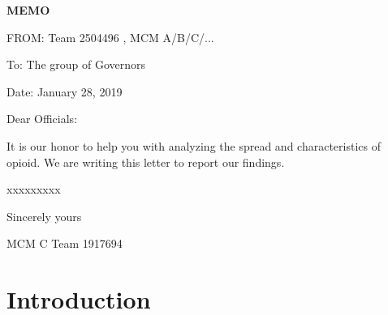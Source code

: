 \documentclass[13pt]{article}
\begin{document}

\setmainfont{TeX Gyre Pagella}
\newpage
{}
\thispagestyle{empty}

{\centering \fontsize{18pt}{14pt}\selectfont \textbf{MEMO}\par}

\noindent FROM: Team {} 2504496 , MCM A/B/C/...

\noindent To: The group of Governors

\noindent Date: January 28, 2019

\vspace{10pt}

Dear Officials:

It is our honor to help you with analyzing the spread and characteristics of opioid. We are writing this letter to report our findings.

xxxxxxxxx

\thispagestyle{empty}
{\raggedleft
Sincerely yours

MCM C Team 1917694\par
}

\newpage
\thispagestyle{empty}
\tableofcontents
\newpage
\setcounter{page}{1}

\fancyhf{}
\fancyhead[C]{ }
\fancyfoot[C]{\bfseries\thepage}















\section{Introduction}
\end{document}

